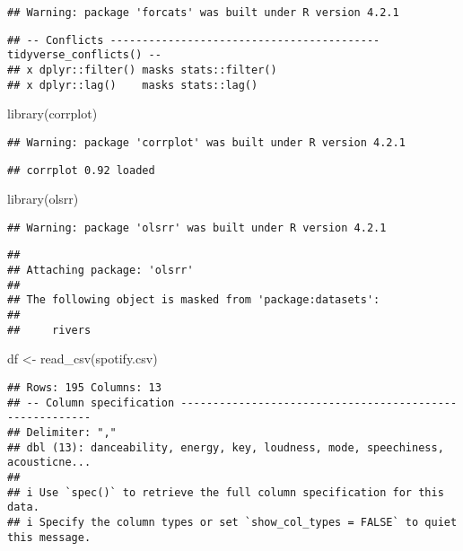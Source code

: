 \documentclass[
]{article}
\newenvironment{Shaded}{\begin{snugshade}}{\end{snugshade}}
\newcommand{\FunctionTok}[1]{\textcolor[rgb]{0.00,0.00,0.00}{#1}}
\newcommand{\NormalTok}[1]{#1}
\newcommand{\OtherTok}[1]{\textcolor[rgb]{0.56,0.35,0.01}{#1}}
\newcommand{\StringTok}[1]{\textcolor[rgb]{0.31,0.60,0.02}{#1}}
\begin{document}
\begin{verbatim}
## Warning: package 'forcats' was built under R version 4.2.1
\end{verbatim}

\begin{verbatim}
## -- Conflicts ------------------------------------------ tidyverse_conflicts() --
## x dplyr::filter() masks stats::filter()
## x dplyr::lag()    masks stats::lag()
\end{verbatim}

\begin{Shaded}
\begin{Highlighting}[]
\FunctionTok{library}\NormalTok{(corrplot)}
\end{Highlighting}
\end{Shaded}

\begin{verbatim}
## Warning: package 'corrplot' was built under R version 4.2.1
\end{verbatim}

\begin{verbatim}
## corrplot 0.92 loaded
\end{verbatim}

\begin{Shaded}
\begin{Highlighting}[]
\FunctionTok{library}\NormalTok{(olsrr)}
\end{Highlighting}
\end{Shaded}

\begin{verbatim}
## Warning: package 'olsrr' was built under R version 4.2.1
\end{verbatim}

\begin{verbatim}
## 
## Attaching package: 'olsrr'
## 
## The following object is masked from 'package:datasets':
## 
##     rivers
\end{verbatim}

\begin{Shaded}
\begin{Highlighting}[]
\NormalTok{df }\OtherTok{\textless{}{-}} \FunctionTok{read\_csv}\NormalTok{(}\StringTok{\textquotesingle{}spotify.csv\textquotesingle{}}\NormalTok{)}
\end{Highlighting}
\end{Shaded}

\begin{verbatim}
## Rows: 195 Columns: 13
## -- Column specification --------------------------------------------------------
## Delimiter: ","
## dbl (13): danceability, energy, key, loudness, mode, speechiness, acousticne...
## 
## i Use `spec()` to retrieve the full column specification for this data.
## i Specify the column types or set `show_col_types = FALSE` to quiet this message.
\end{verbatim}
\end{document}
